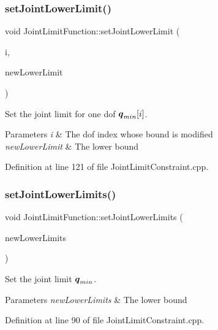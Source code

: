 \subsubsection{\texorpdfstring{set\+Joint\+Lower\+Limit()}{setJointLowerLimit()}}
{\footnotesize\ttfamily void Joint\+Limit\+Function\+::set\+Joint\+Lower\+Limit (\begin{DoxyParamCaption}\item[{int}]{i,  }\item[{double}]{new\+Lower\+Limit }\end{DoxyParamCaption})}

Set the joint limit for one dof $ \mbox{\boldmath${q}$}_{min}[i] $.


\begin{DoxyParams}{Parameters}
{\em i} & The dof index whose bound is modified \\
\hline
{\em new\+Lower\+Limit} & The lower bound \\
\hline
\end{DoxyParams}


Definition at line 121 of file Joint\+Limit\+Constraint.\+cpp.

\hypertarget{classocra_1_1JointLimitFunction_af08943f266069853dce1c491ef7f4e08}{}\label{classocra_1_1JointLimitFunction_af08943f266069853dce1c491ef7f4e08} 
\subsubsection{\texorpdfstring{set\+Joint\+Lower\+Limits()}{setJointLowerLimits()}}
{\footnotesize\ttfamily void Joint\+Limit\+Function\+::set\+Joint\+Lower\+Limits (\begin{DoxyParamCaption}\item[{const Eigen\+::\+Vector\+Xd \&}]{new\+Lower\+Limits }\end{DoxyParamCaption})}

Set the joint limit $ \mbox{\boldmath${q}$}_{min} $.


\begin{DoxyParams}{Parameters}
{\em new\+Lower\+Limits} & The lower bound \\
\hline
\end{DoxyParams}


Definition at line 90 of file Joint\+Limit\+Constraint.\+cpp.

